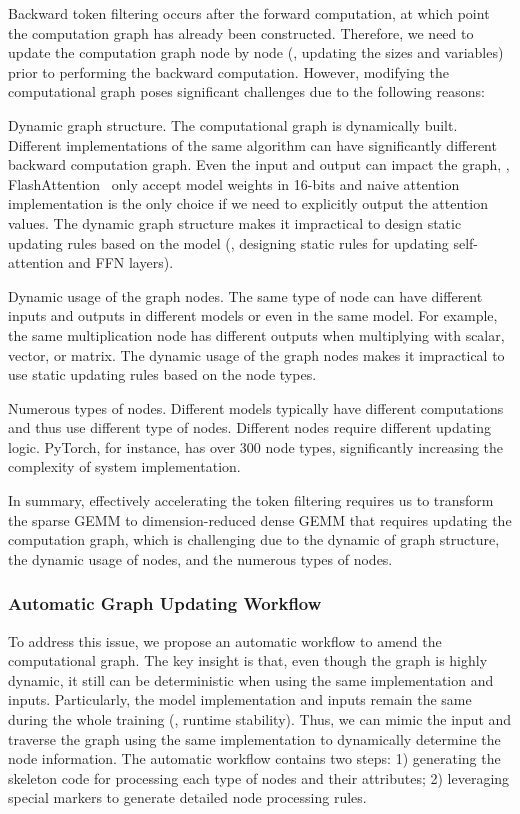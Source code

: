 Backward token filtering occurs after the forward computation, at which point the computation graph has already been constructed. Therefore, we need to update the computation graph node by node (\eg, updating the sizes and variables) prior to performing the backward computation. However, modifying the computational graph poses significant challenges due to the following reasons:

\begin{icompact}
	\item Dynamic graph structure. The computational graph is dynamically built. Different implementations of the same algorithm can have significantly different backward computation graph. Even the input and output can impact the graph, \eg, FlashAttention~\cite{FlashAttention} only accept model weights in 16-bits and naive attention implementation is the only choice if we need to explicitly output the attention values. The dynamic graph structure makes it impractical to design static updating rules based on the model (\eg, designing static rules for updating self-attention and FFN layers).
	\item Dynamic usage of the graph nodes. The same type of node can have different inputs and outputs in different models or even in the same model. For example, the same multiplication node has different outputs when multiplying with scalar, vector, or matrix. The dynamic usage of the graph nodes makes it impractical to use static updating rules based on the node types.
	\item Numerous types of nodes. Different models typically have different computations and thus use different type of nodes. Different nodes require different updating logic. PyTorch, for instance, has over 300 node types, significantly increasing the complexity of system implementation.
\end{icompact}

In summary, effectively accelerating the token filtering requires us to transform the sparse GEMM to dimension-reduced dense GEMM that requires updating the computation graph, which is challenging due to the dynamic of graph structure, the dynamic usage of nodes, and the numerous types of nodes. 


\subsubsection{Automatic Graph Updating Workflow} \label{sec:system:using_markers}

To address this issue, we propose an automatic workflow to amend the computational graph. The key insight is that, even though the graph is highly dynamic, it still can be deterministic when using the same implementation and inputs. Particularly, the model implementation and inputs remain the same during the whole training (\ie, runtime stability). Thus, we can mimic the input and traverse the graph using the same implementation to dynamically determine the node information. 
The automatic workflow contains two steps: 1) generating the skeleton code for processing each type of nodes and their attributes; 2) leveraging special markers to generate detailed node processing rules.

